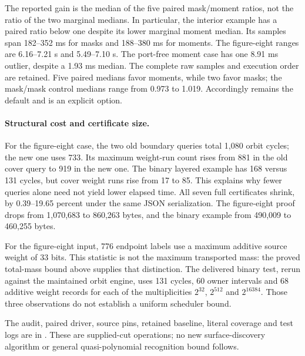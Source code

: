 

The reported gain is the median of the five paired mask/moment ratios,
not the ratio of the two marginal medians. In particular, the interior
example has a paired ratio below one despite its lower marginal moment
median. Its samples span 182--352 ms for masks and 188--380 ms for moments.
The figure-eight ranges are 6.16--7.21 s and 5.49--7.10 s. The port-free
moment case has one 8.91 ms outlier, despite a 1.93 ms median. The complete
raw samples and execution order are retained. Five paired medians favor
moments, while two favor masks; the mask/mask control medians range from
0.973 to 1.019. Accordingly  remains the
default and  is an explicit option.

\paragraph{Structural cost and certificate size.}
For the figure-eight case, the two old boundary queries total 1,080 orbit
cycles; the new one uses 733. Its maximum weight-run count rises from 881
in the old cover query to 919 in the new one. The binary layered example
has 168 versus 131 cycles, but cover weight runs rise from 17 to 85.
This explains why fewer queries alone need not yield lower elapsed time.
All seven full certificates shrink, by 0.39--19.65 percent under the same
JSON serialization. The figure-eight proof drops from 1,070,683 to 860,263
bytes, and the binary example from 490,009 to 460,255 bytes.

For the figure-eight input, 776 endpoint labels use a maximum additive
source weight of 33 bits. This statistic is not the maximum transported
mass: the proved total-mass bound above supplies that distinction.
The delivered binary test, rerun against the maintained orbit engine,
uses 131 cycles, 60 owner intervals and 68 additive weight records for
each of the multiplicities $2^{32}$, $2^{512}$ and $2^{16384}$. Those
three observations do not establish a uniform scheduler bound.

The audit, paired driver, source pins, retained baseline, literal coverage
and test logs are in . These are
supplied-cut operations; no new surface-discovery algorithm or general
quasi-polynomial recognition bound follows.
